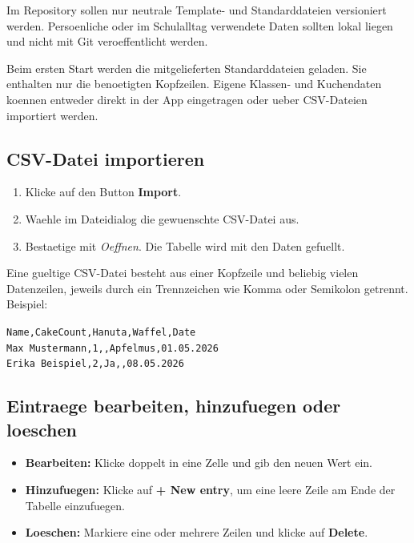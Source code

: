 \documentclass[12pt, a4paper]{article}
\begin{document}
\begin{warnbox}
Im Repository sollen nur neutrale Template- und Standarddateien versioniert
werden. Persoenliche oder im Schulalltag verwendete Daten sollten lokal liegen
und nicht mit Git veroeffentlicht werden.
\end{warnbox}

Beim ersten Start werden die mitgelieferten Standarddateien geladen. Sie enthalten
nur die benoetigten Kopfzeilen. Eigene Klassen- und Kuchendaten koennen entweder
direkt in der App eingetragen oder ueber CSV-Dateien importiert werden.

\subsection{CSV-Datei importieren}

\begin{stepbox}
\begin{enumerate}[leftmargin=1.5em]
    \item Klicke auf den Button \textbf{Import}.
    \item Waehle im Dateidialog die gewuenschte CSV-Datei aus.
    \item Bestaetige mit \emph{Oeffnen}. Die Tabelle wird mit den Daten gefuellt.
\end{enumerate}
\end{stepbox}

\begin{infobox}
Eine gueltige CSV-Datei besteht aus einer Kopfzeile und beliebig vielen
Datenzeilen, jeweils durch ein Trennzeichen wie Komma oder Semikolon getrennt.
Beispiel:
\begin{center}
\texttt{Name,CakeCount,Hanuta,Waffel,Date} \\
\texttt{Max Mustermann,1,,Apfelmus,01.05.2026} \\
\texttt{Erika Beispiel,2,Ja,,08.05.2026}
\end{center}
\end{infobox}

\subsection{Eintraege bearbeiten, hinzufuegen oder loeschen}

\begin{itemize}[leftmargin=1.5em]
    \item \textbf{Bearbeiten:} Klicke doppelt in eine Zelle und gib den neuen Wert ein.
    \item \textbf{Hinzufuegen:} Klicke auf \textbf{+ New entry}, um eine leere Zeile am Ende der Tabelle einzufuegen.
    \item \textbf{Loeschen:} Markiere eine oder mehrere Zeilen und klicke auf \textbf{Delete}.
\end{itemize}
\end{document}
